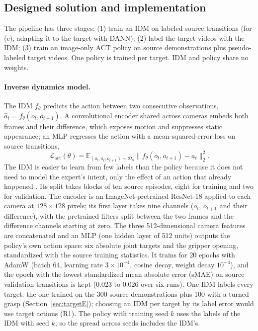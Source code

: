 \documentclass{article}
\begin{document}
\subsection{Designed solution and implementation}
\label{sec:solution}
The pipeline has three stages: (1) train an IDM on labeled source transitions (for (c),
adapting it to the target with DANN); (2) label the target videos with the IDM; (3) train an
image-only ACT policy on source demonstrations plus pseudo-labeled target videos. One
policy is trained per target. IDM and policy share no weights.

\paragraph{Inverse dynamics model.}
The IDM $f_\theta$ predicts the action between two consecutive observations,
$\hat{a}_t = f_\theta(o_t, o_{t+1})$. A convolutional encoder shared across cameras embeds
both frames and their difference, which exposes motion and suppresses static appearance;
an MLP regresses the action with a mean-squared-error loss on source transitions,
\begin{equation}
  \mathcal{L}_{\text{act}}(\theta) = \mathbb{E}_{(o_t, a_t, o_{t+1}) \sim \mathcal{D}_S}
  \big\| f_\theta(o_t, o_{t+1}) - a_t \big\|_2^2 .
\end{equation}
The IDM is easier to learn from few labels than the policy because it does not need to
model the expert's intent, only the effect of an action that already happened
\citep{morin2026idmssil}. Its split takes blocks of ten source episodes, eight for
training and two for validation.
The encoder is an ImageNet-pretrained ResNet-18 applied to each camera at $128 \times 128$
pixels; its first layer takes nine channels ($o_t$, $o_{t+1}$ and their difference), with
the pretrained filters split between the two frames and the difference channels starting
at zero. The three 512-dimensional camera features are concatenated and an MLP (one
hidden layer of 512 units) outputs the policy's own action space: six absolute joint
targets and the gripper opening, standardized with the source training statistics. It
trains for 20 epochs with AdamW (batch 64, learning rate $3 \times 10^{-4}$, cosine
decay, weight decay $10^{-4}$), and the epoch with the lowest standardized mean absolute
error (sMAE) on source validation transitions is kept (0.023 to 0.026 over six runs). One
IDM labels every target: the one trained on the 300 source demonstrations plus 100 with
a turned grasp (Section~\ref{sec:targetE}); choosing an IDM per target by its label error
would use target actions (R1). The policy with training seed $k$ uses the labels of the
IDM with seed $k$, so the spread across seeds includes the IDM's.
\end{document}
